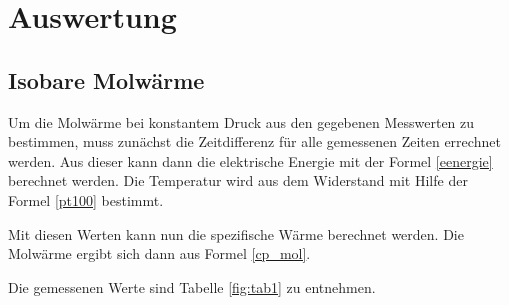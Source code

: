 \section{Auswertung}
\subsection{Isobare Molwärme}
Um die Molwärme bei konstantem Druck aus den gegebenen Messwerten zu bestimmen, muss zunächst die Zeitdifferenz für alle gemessenen Zeiten errechnet werden. Aus dieser kann dann die elektrische Energie mit der Formel \eqref{eenergie} berechnet werden. Die Temperatur wird aus dem Widerstand mit Hilfe der Formel \eqref{pt100} bestimmt.

\noindent Mit diesen Werten kann nun die spezifische Wärme berechnet werden. Die Molwärme ergibt sich dann aus Formel \eqref{cp_mol}.

\noindent Die gemessenen Werte sind Tabelle \ref{fig:tab1} zu entnehmen.   

